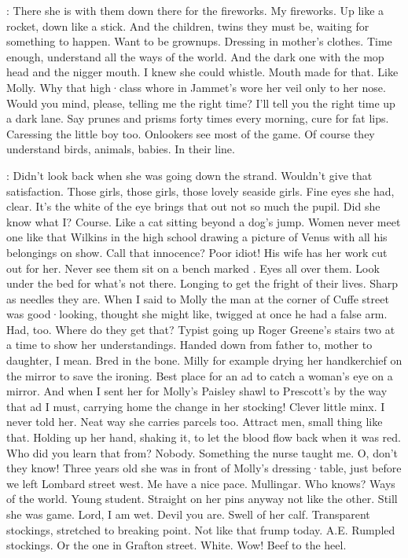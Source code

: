 \Bloom:
There she is with them
down there for the fireworks.
My fireworks.
Up like a rocket,
down like a stick.
And the children,
twins they must be,
waiting for something to happen.
Want to be grownups.
Dressing in mother's clothes.
Time enough,
understand all the ways of the world.
And the dark one
with the mop head
and the nigger mouth.
I knew she could whistle.
Mouth made for that.
Like Molly.
Why that high·class whore in Jammet's
wore her veil
only to her nose.
Would you mind,
please,
telling me the right time?
I'll tell you the right time
up a dark lane.
Say prunes and prisms
forty times every morning,
cure for fat lips.
Caressing the little boy too.
Onlookers see most of the game.
Of course they understand birds,
animals,
babies.
In their line.

\Bloom:
Didn't look back
when she was going down the strand.
Wouldn't give that satisfaction.
Those girls,
those girls,
those lovely seaside girls.
Fine eyes she had,
clear.
It's the white of the eye
brings that out
not so much
the pupil.
Did she know what I?
Course.
Like a cat
sitting beyond a dog's jump.
Women never meet one
like that Wilkins in the high school
drawing a picture of Venus
with all his belongings on show.
Call that innocence?
Poor idiot!
His wife has her work cut out for her.
Never see them sit
on a bench marked .
Eyes all over them.
Look under the bed
for what's not there.
Longing to get the fright of their lives.
Sharp as needles
they are.
When I said to Molly
the man at the corner of Cuffe street
was good·looking,
thought she might like,
twigged at once
he had a false arm.
Had,
too.
Where do they get that?
Typist going up Roger Greene's stairs
two at a time
to show her understandings.
Handed down from father to,
mother to daughter,
I mean.
Bred in the bone.
Milly for example
drying her handkerchief
on the mirror
to save the ironing.
Best place
for an ad to catch a woman's eye
on a mirror.
And when I sent her
for Molly's Paisley shawl
to Prescott's
by the way that ad I must,
carrying home the change
in her stocking!
Clever little minx.
I never told her.
Neat way she carries parcels too.
Attract men,
small thing like that.
Holding up her hand,
shaking it,
to let the blood flow back
when it was red.
Who did you learn that from?
Nobody.
Something the nurse taught me.
O,
don't they know!
Three years old
she was
in front of Molly's dressing·table,
just before we left Lombard street west.
Me have a nice pace.
Mullingar.
Who knows?
Ways of the world.
Young student.
Straight on her pins anyway
not like the other.
Still she was game.
Lord,
I am wet.
Devil you are.
Swell of her calf.
Transparent stockings,
stretched to breaking point.
Not like that frump today.
A.E.
Rumpled stockings.
Or the one in Grafton street.
White.
Wow!
Beef to the heel.

